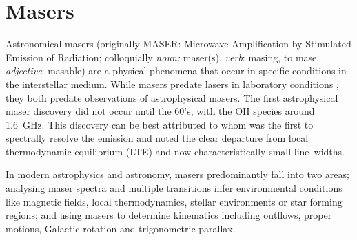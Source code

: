 	\section{Masers}
		Astronomical masers (originally MASER: Microwave Amplification by Stimulated Emission of Radiation; colloquially \textit{noun:} maser(s), \textit{verb}: masing, to mase, \textit{adjective}: masable) are a physical phenomena that occur in specific conditions in the interstellar medium. While masers predate lasers in laboratory conditions \citep[1953;][ vs. 1960 by T. H., Maiman]{maser1955}, they both predate observations of astrophysical masers. The first astrophysical maser discovery did not occur until the 60's, with the OH species around 1.6~GHz. This discovery can be best attributed to \citet{Weaver1965} whom was the first to spectrally resolve the emission and noted the clear departure from local thermodynamic equilibrium (LTE) and now characteristically small line--widths. %
		
		In modern astrophysics and astronomy, masers predominantly fall into two areas; analysing maser spectra and multiple transitions infer environmental conditions like magnetic fields, local thermodynamics, stellar environments or star forming regions; and using masers to determine kinematics including outflows, proper motions, Galactic rotation and trigonometric parallax.
		
